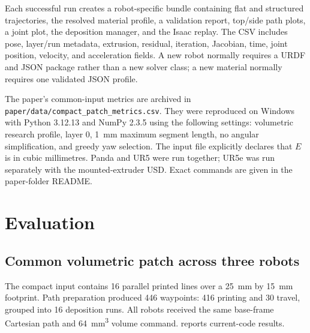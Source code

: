 \documentclass[letterpaper,10pt,conference]{ieeeconf}
\newcommand{\software}[1]{\texttt{#1}}
\begin{document}
Each successful run creates a robot-specific bundle containing flat and
structured trajectories, the resolved material profile, a validation report,
top/side path plots, a joint plot, the deposition manager, and the Isaac replay.
The CSV includes pose, layer/run metadata, extrusion, residual, iteration,
Jacobian, time, joint position, velocity, and acceleration fields.  A new robot
normally requires a URDF and JSON package rather than a new solver class; a new
material normally requires one validated JSON profile.

The paper's common-input metrics are archived in
\software{paper/data/compact\_patch\_metrics.csv}.  They were reproduced on
Windows with Python 3.12.13 and NumPy 2.3.5 using the following settings:
volumetric research profile, layer 0, \SI{1}{\milli\meter} maximum segment
length, no angular simplification, and greedy yaw selection.  The input file
explicitly declares that \(E\) is in cubic millimetres.  Panda and UR5 were run
together; UR5e was run separately with the mounted-extruder USD.  Exact commands
are given in the paper-folder README.

\section{Evaluation}

\subsection{Common volumetric patch across three robots}

The compact input contains 16 parallel printed lines over a
\SI{25}{\milli\meter} by \SI{15}{\milli\meter} footprint.  Path preparation
produced 446 waypoints: 416 printing and 30 travel, grouped into 16 deposition
runs.  All robots received the same base-frame Cartesian path and
\SI{64}{\milli\meter\cubed} volume command.  
reports current-code results.
\end{document}
